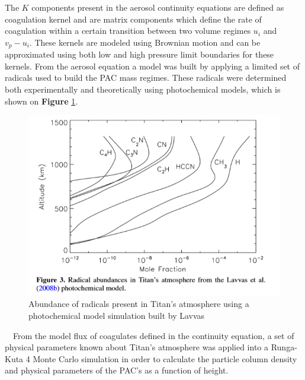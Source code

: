 \documentclass[useAMS,natbib]{mn2e}
\begin{document}
The $K$ components present in the aerosol continuity equations are defined as coagulation kernel and are matrix components which define the rate of coagulation within a certain transition between two volume regimes $u_i$ and $v_p - u_i$. These kernels are modeled using Brownian motion and can be approximated using both low and high pressure limit boundaries for these kernels. From the aerosol equation a model was built by applying a limited set of radicals used to build the PAC mass regimes. These radicals were determined both experimentally and theoretically using photochemical models, which is shown on \textbf{Figure} \ref{rad}.\\
\begin{figure}
\includegraphics[scale = 0.6]{rad_abund}
\caption{Abundance of radicals present in Titan's atmosphere using a photochemical model simulation built by Lavvas}
\label{rad}
\end{figure}
\indent~~From the model flux of coagulates defined in the continuity equation, a set of physical parameters known about Titan's atmosphere was applied into a Runga-Kuta 4 Monte Carlo simulation in order to calculate the particle column density and physical parameters of the PAC's as a function of height.
\end{document}
